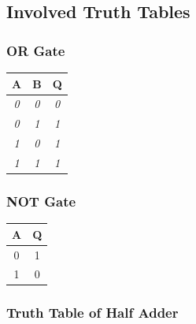 \documentclass[11pt]{article}
\begin{document}
\subsection{Involved Truth Tables}

\subsubsection{OR Gate}

\begin{table}[H]
	\begin{tabular}{|c|c|c|}
		\hline
		{\color[HTML]{000000} \textbf{A}} & {\color[HTML]{000000} \textbf{B}} & {\color[HTML]{000000} \textbf{Q}} \\ \hline
		{\color[HTML]{330001} \textit{0}} & {\color[HTML]{330001} \textit{0}} & {\color[HTML]{F56B00} \textit{0}} \\ \hline
		{\color[HTML]{330001} \textit{0}} & {\color[HTML]{330001} \textit{1}} & {\color[HTML]{F56B00} \textit{1}} \\ \hline
		{\color[HTML]{330001} \textit{1}} & {\color[HTML]{330001} \textit{0}} & {\color[HTML]{F56B00} \textit{1}} \\ \hline
		{\color[HTML]{330001} \textit{1}} & {\color[HTML]{330001} \textit{1}} & {\color[HTML]{F56B00} \textit{1}} \\ \hline
	\end{tabular}
\end{table}
\subsubsection{NOT Gate}

\begin{table}[H]
	\begin{tabular}{|c|c|}
		\hline
		{\color[HTML]{000000} \textbf{A}} & {\color[HTML]{000000} \textbf{Q}} \\ \hline
		{\color[HTML]{000000} 0}          & {\color[HTML]{F56B00} 1}          \\ \hline
		{\color[HTML]{000000} 1}          & {\color[HTML]{F56B00} 0}          \\ \hline
	\end{tabular}
\end{table}
\subsubsection{Truth Table of Half Adder}
\end{document}
